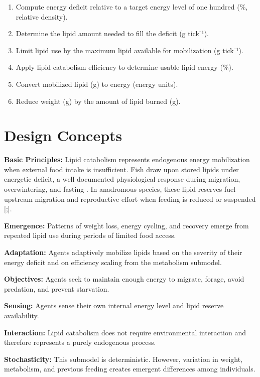 \documentclass[
]{book}
\begin{document}
\begin{enumerate}
\def\labelenumi{\arabic{enumi}.}
\item
  Compute energy deficit relative to a target energy level of one
  hundred (\%, relative density).
\item
  Determine the lipid amount needed to fill the deficit (g tick⁻¹).
\item
  Limit lipid use by the maximum lipid available for mobilization (g
  tick⁻¹).
\item
  Apply lipid catabolism efficiency to determine usable lipid energy
  (\%).
\item
  Convert mobilized lipid (g) to energy (energy units).
\item
  Reduce weight (g) by the amount of lipid burned (g).
\end{enumerate}

\section{Design Concepts}\label{design-concepts-6}

\textbf{Basic Principles:} Lipid catabolism represents endogenous energy
mobilization when external food intake is insufficient. Fish draw upon
stored lipids under energetic deficit, a well documented physiological
response during migration, overwintering, and fasting
\citep{simpkins_physiological_2003}. In anadromous species, these lipid
reserves fuel upstream migration and reproductive effort when feeding is
reduced or suspended {[}\citet{bordeleau_nutritional_2019};{]}.

\textbf{Emergence:} Patterns of weight loss, energy cycling, and recovery
emerge from repeated lipid use during periods of limited food access.

\textbf{Adaptation:} Agents adaptively mobilize lipids based on the severity
of their energy deficit and on efficiency scaling from the metabolism
submodel.

\textbf{Objectives:} Agents seek to maintain enough energy to migrate,
forage, avoid predation, and prevent starvation.

\textbf{Sensing:} Agents sense their own internal energy level and lipid
reserve availability.

\textbf{Interaction:} Lipid catabolism does not require environmental
interaction and therefore represents a purely endogenous process.

\textbf{Stochasticity:} This submodel is deterministic. However, variation in
weight, metabolism, and previous feeding creates emergent differences
among individuals.
\end{document}
